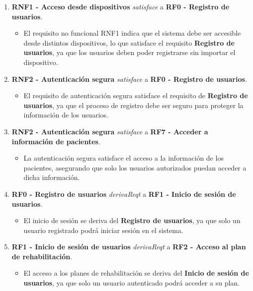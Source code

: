 \documentclass{article}
\begin{document}
\begin{enumerate}
	\item \textbf{RNF1 - Acceso desde dispositivos} \textit{satisface} a \textbf{RF0 - Registro de usuarios}.
	\begin{itemize}
		\item El requisito no funcional RNF1 indica que el sistema debe ser accesible desde distintos dispositivos, lo que satisface el requisito \textbf{Registro de usuarios}, ya que los usuarios deben poder registrarse sin importar el dispositivo.
	\end{itemize}
	
	\item \textbf{RNF2 - Autenticación segura} \textit{satisface} a \textbf{RF0 - Registro de usuarios}.
	\begin{itemize}
		\item El requisito de autenticación segura satisface el requisito de \textbf{Registro de usuarios}, ya que el proceso de registro debe ser seguro para proteger la información de los usuarios.
	\end{itemize}
	
	\item \textbf{RNF2 - Autenticación segura} \textit{satisface} a \textbf{RF7 - Acceder a información de pacientes}.
	\begin{itemize}
		\item La autenticación segura satisface el acceso a la información de los pacientes, asegurando que solo los usuarios autorizados puedan acceder a dicha información.
	\end{itemize}
	
	\item \textbf{RF0 - Registro de usuarios} \textit{derivaReqt} a \textbf{RF1 - Inicio de sesión de usuarios}.
	\begin{itemize}
		\item El inicio de sesión se deriva del \textbf{Registro de usuarios}, ya que solo un usuario registrado podrá iniciar sesión en el sistema.
	\end{itemize}
	
	\item \textbf{RF1 - Inicio de sesión de usuarios} \textit{derivaReqt} a \textbf{RF2 - Acceso al plan de rehabilitación}.
	\begin{itemize}
		\item El acceso a los planes de rehabilitación se deriva del \textbf{Inicio de sesión de usuarios}, ya que solo un usuario autenticado podrá acceder a su plan.
	\end{itemize}
	

\end{enumerate}
\end{document}
